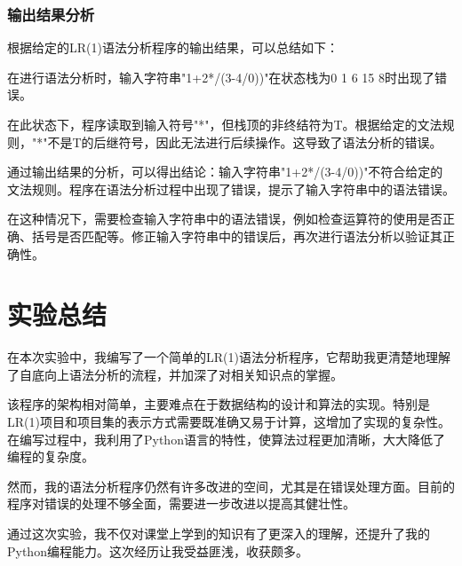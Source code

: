 \documentclass[lang=cn,11pt,a4paper]{elegantpaper}
\begin{document}
\subsubsection{输出结果分析}

根据给定的LR(1)语法分析程序的输出结果，可以总结如下：

在进行语法分析时，输入字符串"1+2*/(3-4/0))"在状态栈为0 1 6 15 8时出现了错误。

在此状态下，程序读取到输入符号"*"，但栈顶的非终结符为T。根据给定的文法规则，"*"不是T的后继符号，因此无法进行后续操作。这导致了语法分析的错误。

通过输出结果的分析，可以得出结论：输入字符串"1+2*/(3-4/0))"不符合给定的文法规则。程序在语法分析过程中出现了错误，提示了输入字符串中的语法错误。

在这种情况下，需要检查输入字符串中的语法错误，例如检查运算符的使用是否正确、括号是否匹配等。修正输入字符串中的错误后，再次进行语法分析以验证其正确性。

\section{实验总结}

在本次实验中，我编写了一个简单的LR(1)语法分析程序，它帮助我更清楚地理解了自底向上语法分析的流程，并加深了对相关知识点的掌握。

该程序的架构相对简单，主要难点在于数据结构的设计和算法的实现。特别是LR(1)项目和项目集的表示方式需要既准确又易于计算，这增加了实现的复杂性。在编写过程中，我利用了Python语言的特性，使算法过程更加清晰，大大降低了编程的复杂度。

然而，我的语法分析程序仍然有许多改进的空间，尤其是在错误处理方面。目前的程序对错误的处理不够全面，需要进一步改进以提高其健壮性。

通过这次实验，我不仅对课堂上学到的知识有了更深入的理解，还提升了我的Python编程能力。这次经历让我受益匪浅，收获颇多。
\end{document}
